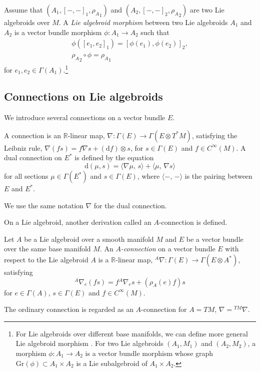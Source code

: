 \documentclass[10pt,a4paper]{amsart}
\numberwithin{equation}{section}
\def\bR{{\mathbb{R}}}
\newcommand{\rhoa}{{\rho_A}}
\newcommand{\bracket}[2]{\langle #1,\,#2\rangle}
\newcommand{\inner}[2]{{({{#1},{#2}})}}
\newcommand{\rd}{\mathrm{d}}
\newcommand{\anabla}{{{}^A \nabla}}
\begin{document}
\begin{Definition}
Assume that $(A_1, [-,-]_1, \rhoa_1)$ and $(A_2, [-,-]_2, \rhoa_2)$ are
two Lie algebroids over $M$.
A \textit{Lie algebroid morphism} between two Lie algebroids $A_1$ and $A_2$
is a vector bundle morphism $\phi\colon A_1 \rightarrow A_2$
such that
\begin{gather}
\phi([e_1, e_2]_1) = [\phi(e_1), \phi(e_2)]_2,\nonumber
\\
\rhoa_2 \circ \phi = \rhoa_1
\label{LAmorphism02}
\end{gather}
for $e_1, e_2 \in \Gamma(A_1)$.\footnote{For Lie algebroids over different base manifolds, we can define more general Lie algebroid morphism \cite{Mackenzie}.
For two Lie algebroids $(A_1, M_1)$ and $(A_2, M_2)$, a morphism $\phi\colon A_1 \rightarrow A_2$ is a vector bundle morphism whose graph
$\mathrm{Gr}(\phi) \subset A_1 \times A_2$ is a Lie subalgebroid of $A_1 \times A_2$.}
\end{Definition}

\subsection{Connections on Lie algebroids}\label{connectionLA}
We introduce several connections on a vector bundle $E$.
\begin{Definition}
A connection is an $\bR$-linear map,
$\nabla\colon\Gamma(E)\rightarrow \Gamma(E \otimes T^*M)$,
satisfying the Leibniz rule,
$
\nabla (f s) = f \nabla s + (\rd f) \otimes s$,
for $s \in \Gamma(E)$ and $f \in C^{\infty}(M)$.
A dual connection on $E^*$ is defined by the equation
\[
\rd \inner{\mu}{s} = \bracket{\nabla \mu}{s} + \bracket{\mu}{\nabla s}
\]
for all sections $\mu \in \Gamma(E^*)$ and $s \in \Gamma(E)$,
where $\bracket{-}{-}$ is the pairing between $E$ and $E^*$.
\end{Definition}
We use the same notation $\nabla$ for the dual connection.

On a Lie algebroid, another derivation called an $A$-connection is defined.
\begin{Definition}
Let $A$ be a Lie algebroid over a smooth manifold $M$ and $E$ be a vector bundle over the same base manifold $M$.
An \textit{$A$-connection} on a vector bundle $E$
with respect to the Lie algebroid $A$ is a $\bR$-linear
map,
$\anabla\colon \Gamma(E) \rightarrow \Gamma(E \otimes A^*)$,
satisfying
\[
\anabla_e (f s) = f \anabla_e s + (\rhoa(e) f) s
\]
for $e \in \Gamma(A)$, $s \in \Gamma(E)$ and $f \in C^{\infty}(M)$.
\end{Definition}
The ordinary connection is regarded as an
$A$-connection for $A=TM$, $\nabla = {}^{TM} \nabla$.
\end{document}
